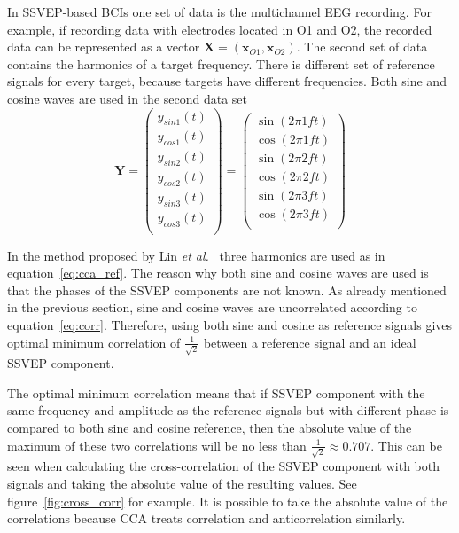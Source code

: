 In \gls{SSVEP}-based \glspl{BCI} one set of data is the multichannel \gls{EEG} recording. For example, if recording data with electrodes located in O1 and O2, the recorded data can be represented as a vector $\mathbf{X}=(\mathbf{x}_{O1}, \mathbf{x}_{O2})$. The second set of data contains the \glspl{harmonic} of a \gls{target} frequency. There is different set of reference signals for every \gls{target}, because \glspl{target} have different frequencies. Both sine and cosine waves are used in the second data set
\begin{equation}
	\label{eq:cca_ref}
	\mathbf{Y}=\begin{pmatrix}
		y_{sin1}(t)\\
		y_{cos1}(t)\\
		y_{sin2}(t)\\
		y_{cos2}(t)\\
		y_{sin3}(t)\\
		y_{cos3}(t)\\
	\end{pmatrix}=\begin{pmatrix}
		\sin(2\pi 1ft)\\
		\cos(2\pi 1ft)\\
		\sin(2\pi 2ft)\\
		\cos(2\pi 2ft)\\
		\sin(2\pi 3ft)\\
		\cos(2\pi 3ft)\\
	\end{pmatrix}
\end{equation}

In the method proposed by Lin \textit{et al.}~\cite{cca_lin} three harmonics are used as in equation~\ref{eq:cca_ref}. The reason why both sine and cosine waves are used is that the phases of the \gls{SSVEP} components are not known. As already mentioned in the previous section, sine and cosine waves are uncorrelated according to equation~\ref{eq:corr}. Therefore, using both sine and cosine as reference signals gives optimal minimum correlation of $\frac{1}{\sqrt{2}}$ between a reference signal and an ideal \gls{SSVEP} component.

The optimal minimum correlation means that if \gls{SSVEP} component with the same frequency and amplitude as the reference signals but with different phase is compared to both sine and cosine reference, then the absolute value of the maximum of these two correlations will be no less than $\frac{1}{\sqrt{2}}\approx 0.707$. This can be seen when calculating the cross-correlation of the \gls{SSVEP} component with both signals and taking the absolute value of the resulting values. See figure~\ref{fig:cross_corr} for example. It is possible to take the absolute value of the correlations because \gls{CCA} treats correlation and anticorrelation similarly.

